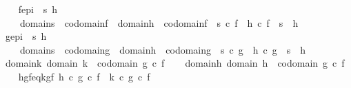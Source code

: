 \begin{isabellebody}
\ \ \isamarkupfalse%
\ f{\isacharunderscore}{\kern0pt}epi\ {\isacharcolon}{\kern0pt}{\isachardoublequoteopen}{\isasymforall}\ s\ h{\isachardot}{\kern0pt}\isanewline
\ \ \ \ {\isacharparenleft}{\kern0pt}domain{\isacharparenleft}{\kern0pt}s{\isacharparenright}{\kern0pt}\ {\isacharequal}{\kern0pt}\ codomain{\isacharparenleft}{\kern0pt}f{\isacharparenright}{\kern0pt}\ {\isasymand}\ domain{\isacharparenleft}{\kern0pt}h{\isacharparenright}{\kern0pt}\ {\isacharequal}{\kern0pt}\ codomain{\isacharparenleft}{\kern0pt}f{\isacharparenright}{\kern0pt}{\isacharparenright}{\kern0pt}\ {\isasymlongrightarrow}\ {\isacharparenleft}{\kern0pt}s\ {\isasymcirc}\isactrlsub c\ f\ {\isacharequal}{\kern0pt}\ h\ {\isasymcirc}\isactrlsub c\ f\ {\isasymlongrightarrow}\ s\ {\isacharequal}{\kern0pt}\ h{\isacharparenright}{\kern0pt}{\isachardoublequoteclose}\isanewline
\ \ \isamarkupfalse%
\ g{\isacharunderscore}{\kern0pt}epi\ {\isacharcolon}{\kern0pt}{\isachardoublequoteopen}{\isasymforall}\ s\ h{\isachardot}{\kern0pt}\isanewline
\ \ \ \ {\isacharparenleft}{\kern0pt}domain{\isacharparenleft}{\kern0pt}s{\isacharparenright}{\kern0pt}\ {\isacharequal}{\kern0pt}\ codomain{\isacharparenleft}{\kern0pt}g{\isacharparenright}{\kern0pt}\ {\isasymand}\ domain{\isacharparenleft}{\kern0pt}h{\isacharparenright}{\kern0pt}\ {\isacharequal}{\kern0pt}\ codomain{\isacharparenleft}{\kern0pt}g{\isacharparenright}{\kern0pt}{\isacharparenright}{\kern0pt}\ {\isasymlongrightarrow}\ {\isacharparenleft}{\kern0pt}s\ {\isasymcirc}\isactrlsub c\ g\ {\isacharequal}{\kern0pt}\ h\ {\isasymcirc}\isactrlsub c\ g\ {\isasymlongrightarrow}\ s\ {\isacharequal}{\kern0pt}\ h{\isacharparenright}{\kern0pt}{\isachardoublequoteclose}\isanewline
\ \ \isamarkupfalse%
\ domain{\isacharunderscore}{\kern0pt}k{\isacharcolon}{\kern0pt}\ {\isachardoublequoteopen}domain\ k\ {\isacharequal}{\kern0pt}\ codomain\ {\isacharparenleft}{\kern0pt}g\ {\isasymcirc}\isactrlsub c\ f{\isacharparenright}{\kern0pt}{\isachardoublequoteclose}\isanewline
\ \ \isamarkupfalse%
\ domain{\isacharunderscore}{\kern0pt}h{\isacharcolon}{\kern0pt}\ {\isachardoublequoteopen}domain\ h\ {\isacharequal}{\kern0pt}\ codomain\ {\isacharparenleft}{\kern0pt}g\ {\isasymcirc}\isactrlsub c\ f{\isacharparenright}{\kern0pt}{\isachardoublequoteclose}\isanewline
\ \ \isamarkupfalse%
\ hgf{\isacharunderscore}{\kern0pt}eq{\isacharunderscore}{\kern0pt}kgf{\isacharcolon}{\kern0pt}\ {\isachardoublequoteopen}h\ {\isasymcirc}\isactrlsub c\ {\isacharparenleft}{\kern0pt}g\ {\isasymcirc}\isactrlsub c\ f{\isacharparenright}{\kern0pt}\ {\isacharequal}{\kern0pt}\ k\ {\isasymcirc}\isactrlsub c\ {\isacharparenleft}{\kern0pt}g\ {\isasymcirc}\isactrlsub c\ f{\isacharparenright}{\kern0pt}{\isachardoublequoteclose}\isanewline

\end{isabellebody}

